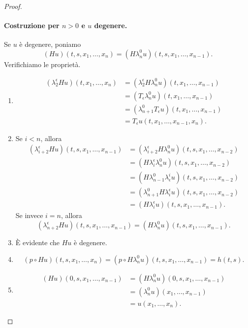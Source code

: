 \begin{proof}
\paragraph{Costruzione per $n>0$ e $u$ degenere.}
Se $u$ è degenere, poniamo
$$
(Hu)(t,s,x_1,\ldots,x_n)=(H\lambda^0_nu)(t,s,x_1,\ldots,x_{n-1}).
$$
Verifichiamo le proprietà.
\begin{enumerate}
\item
\begin{align*}
(\lambda^\epsilon_2Hu)(t,x_1,\ldots,x_n)&=(\lambda^\epsilon_2H\lambda^0_nu)(t,x_1,\ldots,x_{n-1})\\
&=(T_\epsilon\lambda^0_nu)(t,x_1,\ldots,x_{n-1})\\
&=(\lambda^0_{n+1}T_\epsilon u)(t,x_1,\ldots,x_{n-1})\\
&=T_\epsilon u(t,x_1,\ldots,x_{n-1},x_n).
\end{align*}
\item Se $i<n$, allora
\begin{align*}
(\lambda^\epsilon_{i+2}Hu)(t,s,x_1,\ldots,x_{n-1})&=(\lambda^\epsilon_{i+2}H\lambda^0_nu)(t,s,x_1,\ldots,x_{n-2})\\
&=(H\lambda^\epsilon_i\lambda^0_nu)(t,s,x_1,\ldots,x_{n-2})\\
&=(H\lambda^0_{n-1}\lambda^i_\epsilon u)(t,s,x_1,\ldots,x_{n-2})\\
&=(\lambda^0_{n+1}H\lambda^\epsilon_iu)(t,s,x_1,\ldots,x_{n-2})\\
&=(H\lambda^\epsilon_iu)(t,s,x_1,\ldots,x_{n-1}).
\end{align*}
Se invece $i=n$, allora
$$
(\lambda^\epsilon_{n+2}Hu)(t,s,x_1,\ldots,x_{n-1})=(H\lambda^0_nu)(t,s,x_1,\ldots,x_{n-1}).
$$
\item È evidente che $Hu$ è degenere.
\item
$$
(p\circ Hu)(t,s,x_1,\ldots,x_n)=(p\circ H\lambda^0_nu)(t,s,x_1,\ldots,x_{n-1})=h(t,s).
$$
\item
\begin{align*}
(Hu)(0,s,x_1,\ldots,x_{n-1})&=(H\lambda^0_nu)(0,s,x_1,\ldots,x_{n-1})\\
&=(\lambda^0_nu)(x_1,\ldots,x_{n-1})\\
&=u(x_1,\ldots,x_n).
\end{align*}
\end{enumerate}

\end{proof}
